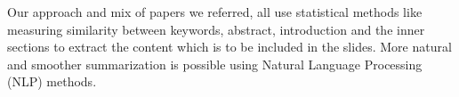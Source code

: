 Our approach and mix of papers we referred, all use statistical methods like measuring
similarity between keywords, abstract, introduction and the inner sections to extract the content which is to be included in the slides. More natural and smoother summarization is
possible using Natural Language Processing (NLP) methods.